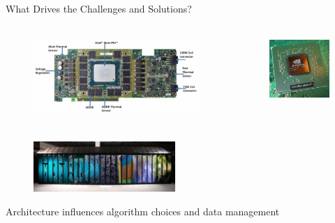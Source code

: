 \documentclass[xcolor=x11names,compress]{beamer}
\renewcommand{\(}{\begin{columns}}
\renewcommand{\)}{\end{columns}}
\newcommand{\<}[1]{\begin{column}{#1}}
\renewcommand{\>}{\end{column}}
\begin{document}
\begin{frame}{What Drives the Challenges and Solutions?}
    
    \begin{columns}
    \begin{column}{0.3\textwidth}
 	   \begin{center}
 	   \begin{figure}     
 	   \includegraphics[height=1.25in,clip]{../figs/Intel-Xeon-Phi-Board}
 	   \end{figure}
 	   \end{center}
    \end{column}
 	\begin{column}{0.8\textwidth}
 	   \begin{center}
 	   \begin{figure} 
 	   \includegraphics[height=1in,clip]{../figs/GPU}
       \end{figure}
 	   \end{center}
  	\end{column}
	\end{columns}
	
	\begin{center}
 	\begin{figure}
 	\includegraphics[height=0.75in,clip]{../figs/Titan}
    \end{figure}
 	\end{center}
 	
 	\textcolor{dgreen}{Architecture} influences algorithm choices and data management
	
\end{frame}
\end{document}
